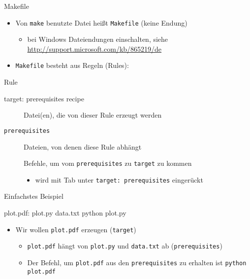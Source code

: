 \begin{frame}[fragile]{Makefile}
  \begin{itemize}
    \item Von \texttt{make} benutzte Datei heißt \texttt{Makefile} (keine Endung)
      \begin{itemize}
        \item bei Windows Dateiendungen einschalten, siehe \url{http://support.microsoft.com/kb/865219/de}
      \end{itemize}
    \item \texttt{Makefile} besteht aus Regeln (Rules):
  \end{itemize}
  \begin{block}{Rule}
    \centering
    \begin{lstmake}
      target: prerequisites
          recipe
    \end{lstmake}
  \end{block}
  \begin{description}
    \item[\texttt{\hphantom{prerequisites}}] Datei(en), die von dieser Rule erzeugt werden
    \item[\texttt{prerequisites}]                         Dateien, von denen diese Rule abhängt
    \item[\texttt{\hphantom{prerequisites}}] Befehle, um vom \texttt{prerequisites} zu \texttt{target} zu kommen
    \begin{itemize}
      \item wird mit Tab unter \texttt{target: prerequisites} eingerückt
    \end{itemize}
  \end{description}
\end{frame}

\begin{frame}[fragile]{Einfachstes Beispiel}
  \begin{center}
    \begin{lstmake}
      plot.pdf: plot.py data.txt
          python plot.py
    \end{lstmake}
  \end{center}
  \begin{itemize}
    \item Wir wollen \texttt{plot.pdf} erzeugen (\texttt{target})
    \begin{itemize}
      \item \texttt{plot.pdf} hängt von \texttt{plot.py} und \texttt{data.txt} ab (\texttt{prerequisites})
      \item Der Befehl, um \texttt{plot.pdf} aus den \texttt{prerequisites} zu erhalten ist \texttt{python plot.pdf}
    \end{itemize}
  \end{itemize}
\end{frame}

